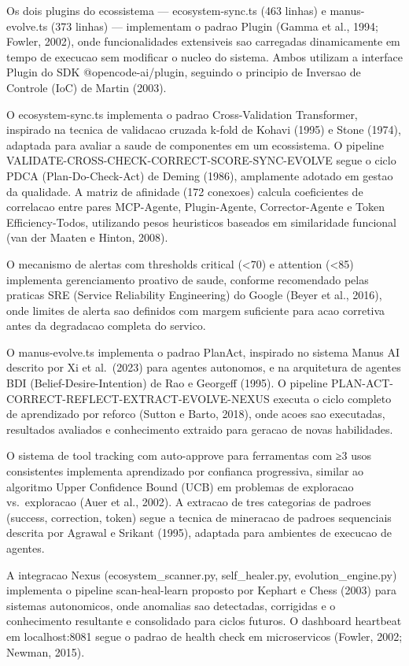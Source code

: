 \documentclass[
  12pt,
]{article}
\begin{document}
Os dois plugins do ecossistema --- ecosystem-sync.ts (463 linhas) e
manus-evolve.ts (373 linhas) --- implementam o padrao Plugin (Gamma et
al., 1994; Fowler, 2002), onde funcionalidades extensiveis sao
carregadas dinamicamente em tempo de execucao sem modificar o nucleo do
sistema. Ambos utilizam a interface Plugin do SDK @opencode-ai/plugin,
seguindo o principio de Inversao de Controle (IoC) de Martin (2003).

O ecosystem-sync.ts implementa o padrao Cross-Validation Transformer,
inspirado na tecnica de validacao cruzada k-fold de Kohavi (1995) e
Stone (1974), adaptada para avaliar a saude de componentes em um
ecossistema. O pipeline VALIDATE-CROSS-CHECK-CORRECT-SCORE-SYNC-EVOLVE
segue o ciclo PDCA (Plan-Do-Check-Act) de Deming (1986), amplamente
adotado em gestao da qualidade. A matriz de afinidade (172 conexoes)
calcula coeficientes de correlacao entre pares MCP-Agente,
Plugin-Agente, Corrector-Agente e Token Efficiency-Todos, utilizando
pesos heuristicos baseados em similaridade funcional (van der Maaten e
Hinton, 2008).

O mecanismo de alertas com thresholds critical (\textless70) e attention
(\textless85) implementa gerenciamento proativo de saude, conforme
recomendado pelas praticas SRE (Service Reliability Engineering) do
Google (Beyer et al., 2016), onde limites de alerta sao definidos com
margem suficiente para acao corretiva antes da degradacao completa do
servico.

O manus-evolve.ts implementa o padrao PlanAct, inspirado no sistema
Manus AI descrito por Xi et al.~(2023) para agentes autonomos, e na
arquitetura de agentes BDI (Belief-Desire-Intention) de Rao e Georgeff
(1995). O pipeline PLAN-ACT-CORRECT-REFLECT-EXTRACT-EVOLVE-NEXUS executa
o ciclo completo de aprendizado por reforco (Sutton e Barto, 2018), onde
acoes sao executadas, resultados avaliados e conhecimento extraido para
geracao de novas habilidades.

O sistema de tool tracking com auto-approve para ferramentas com ≥3 usos
consistentes implementa aprendizado por confianca progressiva, similar
ao algoritmo Upper Confidence Bound (UCB) em problemas de exploracao
vs.~exploracao (Auer et al., 2002). A extracao de tres categorias de
padroes (success, correction, token) segue a tecnica de mineracao de
padroes sequenciais descrita por Agrawal e Srikant (1995), adaptada para
ambientes de execucao de agentes.

A integracao Nexus (ecosystem\_scanner.py, self\_healer.py,
evolution\_engine.py) implementa o pipeline scan-heal-learn proposto por
Kephart e Chess (2003) para sistemas autonomicos, onde anomalias sao
detectadas, corrigidas e o conhecimento resultante e consolidado para
ciclos futuros. O dashboard heartbeat em localhost:8081 segue o padrao
de health check em microservicos (Fowler, 2002; Newman, 2015).
\end{document}
